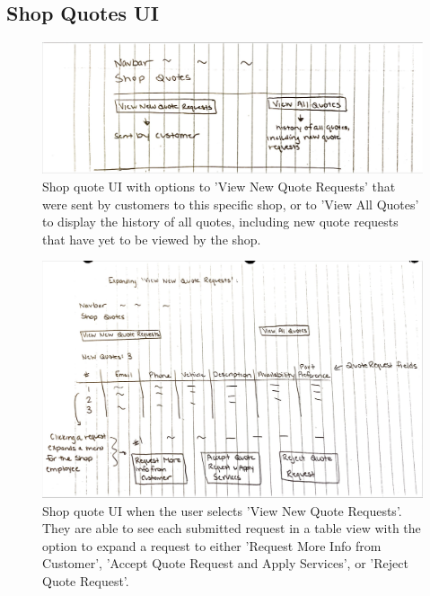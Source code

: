 \documentclass[12pt, titlepage]{article}
\begin{document}
\subsection{Shop Quotes UI}
\begin{figure}[H]
    \centering
    \includegraphics[width=\textwidth]{Design/SystDesign/Quotes/Quote1.png}
    \caption{Shop quote UI with options to 'View New Quote Requests' that were sent by customers to this specific shop, or to 'View All Quotes' to display the history of all quotes, including new quote requests that have yet to be viewed by the shop.}
    \label{fig:quoteUI1}
\end{figure}

\begin{figure}[H]
    \centering
    \includegraphics[width=\textwidth]{Design/SystDesign/Quotes/Quote2.png}
    \caption{Shop quote UI when the user selects 'View New Quote Requests'. They are able to see each submitted request in a table view with the option to expand a request to either 'Request More Info from Customer', 'Accept Quote Request and Apply Services', or 'Reject Quote Request'.}
    \label{fig:quoteUI2}
\end{figure}
\end{document}
